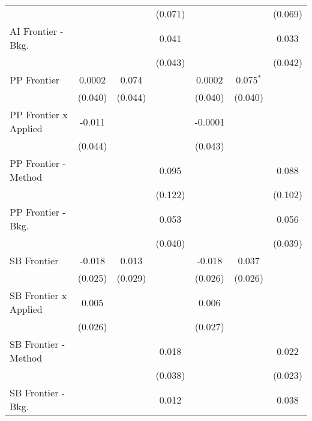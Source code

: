 \begin{tabular}{lcccccc}
                                &              &         & (0.071) &               &             & (0.069)\\   
   AI Frontier - Bkg.           &              &         & 0.041   &               &             & 0.033\\   
                                &              &         & (0.043) &               &             & (0.042)\\   
   PP Frontier                  & 0.0002       & 0.074   &         & 0.0002        & 0.075$^{*}$ &   \\   
                                & (0.040)      & (0.044) &         & (0.040)       & (0.040)     &   \\   
   PP Frontier x Applied        & -0.011       &         &         & -0.0001       &             &   \\   
                                & (0.044)      &         &         & (0.043)       &             &   \\   
   PP Frontier - Method         &              &         & 0.095   &               &             & 0.088\\   
                                &              &         & (0.122) &               &             & (0.102)\\   
   PP Frontier - Bkg.           &              &         & 0.053   &               &             & 0.056\\   
                                &              &         & (0.040) &               &             & (0.039)\\   
   SB Frontier                  & -0.018       & 0.013   &         & -0.018        & 0.037       &   \\   
                                & (0.025)      & (0.029) &         & (0.026)       & (0.026)     &   \\   
   SB Frontier x Applied        & 0.005        &         &         & 0.006         &             &   \\   
                                & (0.026)      &         &         & (0.027)       &             &   \\   
   SB Frontier - Method         &              &         & 0.018   &               &             & 0.022\\   
                                &              &         & (0.038) &               &             & (0.023)\\   
   SB Frontier - Bkg.           &              &         & 0.012   &               &             & 0.038\\   

\end{tabular}
